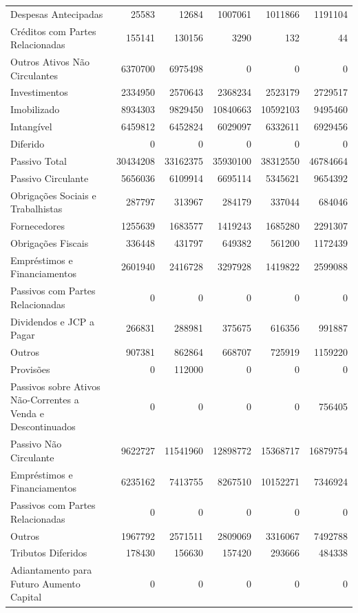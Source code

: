 \documentclass[grad,numbers]{coppe}
\begin{document}
\begin{longtable}[t]{>{\raggedright\arraybackslash}p{6cm}rrrrr}
  Despesas Antecipadas & 25583 & 12684 & 1007061 & 1011866 & 1191104\\
  Créditos com Partes Relacionadas & 155141 & 130156 & 3290 & 132 & 44\\
  Outros Ativos Não Circulantes & 6370700 & 6975498 & 0 & 0 & 0\\
  \addlinespace
  Investimentos & 2334950 & 2570643 & 2368234 & 2523179 & 2729517\\
  Imobilizado & 8934303 & 9829450 & 10840663 & 10592103 & 9495460\\
  Intangível & 6459812 & 6452824 & 6029097 & 6332611 & 6929456\\
  Diferido & 0 & 0 & 0 & 0 & 0\\
  Passivo Total & 30434208 & 33162375 & 35930100 & 38312550 & 46784664\\
  \addlinespace
  Passivo Circulante & 5656036 & 6109914 & 6695114 & 5345621 & 9654392\\
  Obrigações Sociais e Trabalhistas & 287797 & 313967 & 284179 & 337044 & 684046\\
  Fornecedores & 1255639 & 1683577 & 1419243 & 1685280 & 2291307\\
  Obrigações Fiscais & 336448 & 431797 & 649382 & 561200 & 1172439\\
  Empréstimos e Financiamentos & 2601940 & 2416728 & 3297928 & 1419822 & 2599088\\
  \addlinespace
  Passivos com Partes Relacionadas & 0 & 0 & 0 & 0 & \vphantom{1} 0\\
  Dividendos e JCP a Pagar & 266831 & 288981 & 375675 & 616356 & 991887\\
  Outros & 907381 & 862864 & 668707 & 725919 & 1159220\\
  Provisões & 0 & 112000 & 0 & 0 & 0\\
  Passivos sobre Ativos Não-Correntes a Venda e Descontinuados & 0 & 0 & 0 & 0 & 756405\\
  \addlinespace
  Passivo Não Circulante & 9622727 & 11541960 & 12898772 & 15368717 & 16879754\\
  Empréstimos e Financiamentos & 6235162 & 7413755 & 8267510 & 10152271 & 7346924\\
  Passivos com Partes Relacionadas & 0 & 0 & 0 & 0 & 0\\
  Outros & 1967792 & 2571511 & 2809069 & 3316067 & 7492788\\
  Tributos Diferidos & 178430 & 156630 & 157420 & 293666 & 484338\\
  \addlinespace
  Adiantamento para Futuro Aumento Capital & 0 & 0 & 0 & 0 & \vphantom{1} 0\\

\end{longtable}
\end{document}
